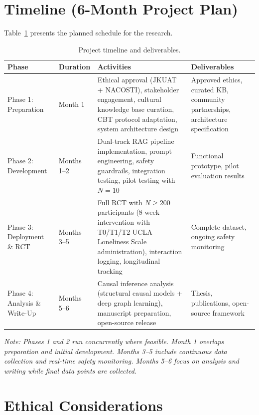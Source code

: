 \documentclass[12pt,a4paper]{article}
\begin{document}
\section{Timeline (6-Month Project Plan)}

Table~\ref{tab:timeline} presents the planned schedule for the research.

\begin{table}[H]
\centering
\caption{Project timeline and deliverables.}
\label{tab:timeline}
\small
\begin{tabularx}{\textwidth}{p{3cm}p{1.8cm}X p{4.5cm}}
\toprule
\textbf{Phase} & \textbf{Duration} & \textbf{Activities} & \textbf{Deliverables} \\
\midrule
Phase 1: Preparation &
Month 1 &
Ethical approval (JKUAT + NACOSTI), stakeholder engagement, cultural knowledge base curation, CBT protocol adaptation, system architecture design &
Approved ethics, curated KB, community partnerships, architecture specification \\
\addlinespace
Phase 2: Development &
Months 1--2 &
Dual-track RAG pipeline implementation, prompt engineering, safety guardrails, integration testing, pilot testing with $N{=}10$ &
Functional prototype, pilot evaluation results \\
\addlinespace
Phase 3: Deployment \& RCT &
Months 3--5 &
Full RCT with $N{\geq}200$ participants (8-week intervention with T0/T1/T2 UCLA Loneliness Scale administration), interaction logging, longitudinal tracking &
Complete dataset, ongoing safety monitoring \\
\addlinespace
Phase 4: Analysis \& Write-Up &
Months 5--6 &
Causal inference analysis (structural causal models + deep graph learning), manuscript preparation, open-source release &
Thesis, publications, open-source framework \\
\bottomrule
\end{tabularx}
\end{table}

\noindent\textit{Note: Phases 1 and 2 run concurrently where feasible. Month 1 overlaps preparation and initial development. Months 3--5 include continuous data collection and real-time safety monitoring. Months 5--6 focus on analysis and writing while final data points are collected.}

\section{Ethical Considerations}
\end{document}
